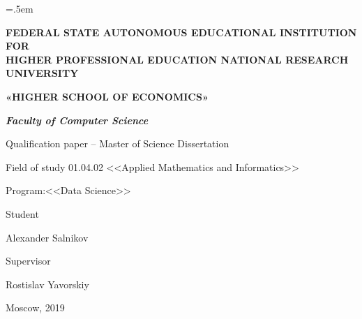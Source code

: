 \newpage
\thispagestyle{empty}

\begin{centering}

\linespread{1.3}\parskip=.5em

{

\smallskip\small

\textbf{FEDERAL STATE AUTONOMOUS EDUCATIONAL INSTITUTION FOR}\\
\textbf{HIGHER PROFESSIONAL EDUCATION NATIONAL RESEARCH UNIVERSITY}
\smallskip

\textbf{«HIGHER SCHOOL OF ECONOMICS»}

\smallskip\normalsize

\textit{\textbf{Faculty of Computer Science}}
\vfill{}

\noindent\underline{{}}

\large{\bigskip\bigskip{}
\noindent\underline{}}

\large{\bigskip{}
\noindent\underline{}}


\vfill
\normalsize
Qualification paper – Master of Science Dissertation

Field of study 01.04.02 <<Applied Mathematics and Informatics>>

Program:<<Data Science>>}
\vfill


\begin{minipage}[t]{.65\textwidth}
Student

\bigskip\bigskip
\makebox[2in]{\hrulefill}

Alexander Salnikov
\end{minipage}%
%
\begin{minipage}[t]{.35\textwidth}
\begin{flushright}
Supervisor

\bigskip\bigskip
\makebox[2in]{\hrulefill}

Rostislav Yavorskiy
\end{flushright}
\end{minipage}

\vfill

{Moscow, 2019}

\end{centering}
